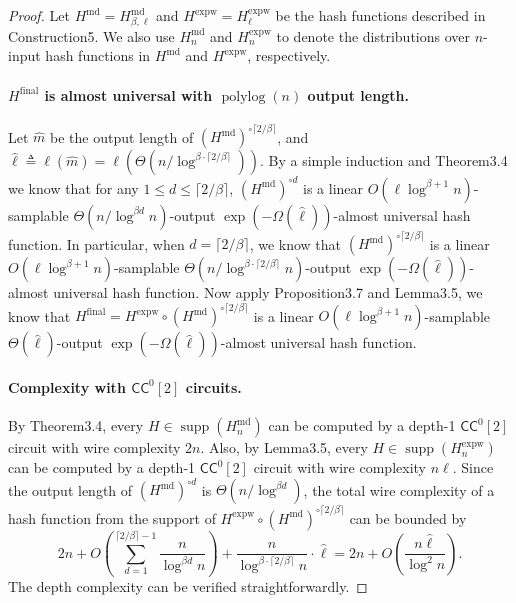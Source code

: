 \documentclass[10pt,a4paper]{article}
\begin{document}
\begin{proof}
Let $H^{\mathrm{md}}=H^{\mathrm{md}}_{\beta,\ell}$ and $H^{\mathrm{expw}}=H^{\mathrm{expw}}_\ell$ be the hash functions described in Construction5. We also use $H_n^{\mathrm{md}}$ and $H_n^{\mathrm{expw}}$ to denote the distributions over $n$-input hash functions in $H^{\mathrm{md}}$ and $H^{\mathrm{expw}}$, respectively.
\paragraph{$H^{\mathrm{final}}$ is almost universal with $\operatorname{polylog}(n)$ output length.}
Let $\hat m$ be the output length of $(H^{\mathrm{md}})^{\circ\lceil2/\beta\rceil}$, and $\hat\ell\triangleq\ell(\hat m)=\ell(\Theta(n/\log^{\beta\cdot\lceil2/\beta\rceil}))$. By a simple induction and Theorem3.4 we know that for any $1\le d\le\lceil2/\beta\rceil$, $(H^{\mathrm{md}})^{\circ d}$ is a linear $O(\ell\log^{\beta+1}n)$-samplable $\Theta(n/\log^{\beta d}n)$-output $\exp(-\Omega(\hat\ell))$-almost universal hash function. In particular, when $d=\lceil2/\beta\rceil$, we know that $(H^{\mathrm{md}})^{\circ\lceil2/\beta\rceil}$ is a linear $O(\ell\log^{\beta+1}n)$-samplable $\Theta(n/\log^{\beta\cdot\lceil2/\beta\rceil}n)$-output $\exp(-\Omega(\hat\ell))$-almost universal hash function.
Now apply Proposition3.7 and Lemma3.5, we know that $H^{\mathrm{final}}=H^{\mathrm{expw}}\circ(H^{\mathrm{md}})^{\circ\lceil2/\beta\rceil}$ is a linear $O(\ell\log^{\beta+1}n)$-samplable $\Theta(\hat\ell)$-output $\exp(-\Omega(\hat\ell))$-almost universal hash function.
\paragraph{Complexity with $\mathsf{CC}^0[2]$ circuits.}
By Theorem3.4, every $H\in\operatorname{supp}(H_n^{\mathrm{md}})$ can be computed by a depth-1 $\mathsf{CC}^0[2]$ circuit with wire complexity $2n$. Also, by Lemma3.5, every $H\in\operatorname{supp}(H_n^{\mathrm{expw}})$ can be computed by a depth-1 $\mathsf{CC}^0[2]$ circuit with wire complexity $n\ell$. Since the output length of $(H^{\mathrm{md}})^{\circ d}$ is $\Theta(n/\log^{\beta d})$, the total wire complexity of a hash function from the support of $H^{\mathrm{expw}}\circ(H^{\mathrm{md}})^{\circ\lceil2/\beta\rceil}$ can be bounded by
\[2n+O\left(\sum_{d=1}^{\lceil2/\beta\rceil-1}\frac n{\log^{\beta d}n}\right)+\frac n{\log^{\beta\cdot\lceil2/\beta\rceil}n}\cdot\hat\ell=2n+O\left(\frac{n\hat\ell}{\log^2n}\right).\]
The depth complexity can be verified straightforwardly.

\end{proof}
\end{document}
